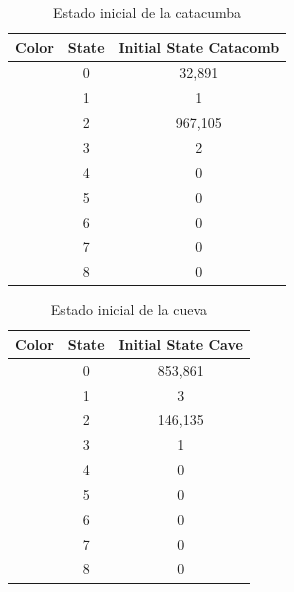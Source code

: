         \begin{table}[h]
            \begin{center}
                \begin{tabular}{|c|c|c|}
                    \hline
                    \textbf{Color}&\textbf{State}&\textbf{Initial State Catacomb} \\
                    \hline
                    \cellcolor{blue} & 0 & 32,891  \\
                    \cellcolor{royalblue} & 1 & 1 \\
                    \cellcolor{red} & 2 & 967,105 \\
                    \cellcolor{black} & 3 & 2 \\
                    \cellcolor{yellow} & 4 & 0 \\
                    \cellcolor{darkgreen} & 5 & 0 \\
                    \cellcolor{lemon} & 6 & 0 \\
                    \cellcolor{darkgray} & 7 & 0 \\
                    \cellcolor{green} & 8 & 0 \\
                    \hline
                \end{tabular}
            \end{center}
            \caption{Estado inicial de la catacumba}
            \label{tab:estados02}
        \end{table}
        \begin{table}[h]
            \begin{center}
                \begin{tabular}{|c|c|c|}
                    \hline
                    \textbf{Color}&\textbf{State}&\textbf{Initial State Cave} \\
                    \hline
                    \cellcolor{blue} & 0 & 853,861  \\
                    \cellcolor{royalblue} & 1 & 3 \\
                    \cellcolor{red} & 2 & 146,135 \\
                    \cellcolor{black} & 3 & 1 \\
                    \cellcolor{yellow} & 4 & 0 \\
                    \cellcolor{darkgreen} & 5 & 0 \\
                    \cellcolor{lemon} & 6 & 0 \\
                    \cellcolor{darkgray} & 7 & 0 \\
                    \cellcolor{green} & 8 & 0 \\
                    \hline
                \end{tabular}
            \end{center}
            \caption{Estado inicial de la cueva}
            \label{tab:estados03}
        \end{table}
